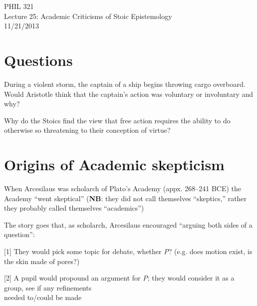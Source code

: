 \documentclass[11pt]{article}
\begin{document}
\thispagestyle{empty}
\begin{center} \LARGE{PHIL 321\\ Lecture 25: Academic Criticisms of Stoic Epistemology}\\ \vspace*{2mm}
\large{11/21/2013}\end{center}
\thispagestyle{empty}\vspace*{3mm}
\vspace*{-8mm}

\section*{Questions}

\noindent During a violent storm, the captain of a ship begins throwing cargo overboard. Would Aristotle think that the captain's action was voluntary or involuntary and why?
\vspace*{2mm}

\noindent Why do the Stoics find the view that free action requires the ability to do otherwise so threatening to their conception of virtue?

\section*{Origins of Academic skepticism}

\noindent When Arcesilaus was scholarch of Plato's Academy (appx. 268--241 BCE) the Academy ``went skeptical'' (\textbf{NB}: they did not call themselves ``skeptics,'' rather they probably called themselves ``academics'')
\vspace*{2mm}

\noindent The story goes that, as scholarch, Arcesilaus encouraged ``arguing both sides of a question'':
\vspace*{2mm}

[1] They would pick some topic for debate, whether \emph{P}? (e.g. does motion exist, is the skin made of pores?)
\vspace*{-4mm}

[2] A pupil would propound an argument for \emph{P}; they would consider it as a group, see if any refinements\\\hspace*{12mm}needed to/could be made
\vspace*{1mm}
\end{document}

